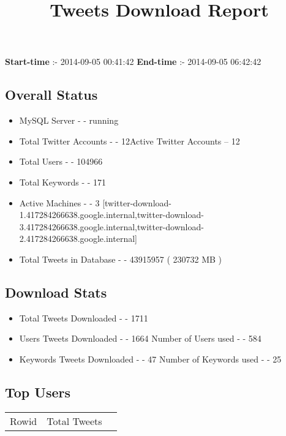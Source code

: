 \documentclass{article}\usepackage[T1]{fontenc}
\begin{document}
\title{\textbf{Tweets Download Report}}
               \date{}
                \maketitle
               \centerline{\textbf{Start-time} :- 2014-09-05 00:41:42 \hspace{40pt} \textbf{End-time} :- 2014-09-05 06:42:42}               \subsection*{Overall Status}                \begin{itemize}                \item MySQL Server - - running               \item Total Twitter Accounts - - 12\newline Active Twitter Accounts -- 12               \item Total Users - - 104966               \item Total Keywords - - 171               \item Active Machines - - 3 [twitter-download-1.417284266638.google.internal,twitter-download-3.417284266638.google.internal,twitter-download-2.417284266638.google.internal]               \item Total Tweets in Database - - 43915957 ( 230732 MB )               \end{itemize}               \subsection*{Download Stats}                \begin{itemize}                \item Total Tweets Downloaded - - 1711               \item Users Tweets Downloaded - - 1664 \newline Number of Users used - - 584               \item Keywords Tweets Downloaded - - 47 \newline Number of Keywords used - - 25              \end{itemize}              \subsection*{Top Users}\begin{tabular}{|c|c|c|}         \hline         Rowid & Total Tweets \\ 

\end{tabular}
\end{document}
